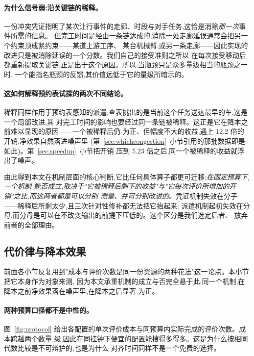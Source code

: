 \documentclass[manuscript,screen,review]{acmart}
\newcommand{\CostMultBefore}{12.2}
\newcommand{\CostMultAfter}{5.23}
\begin{document}
\paragraph{为什么信号弱:沿关键链的稀释。}
一份冲突凭证指明了某次让行事件的走廊、时段与对手任务,这恰是消除\emph{那一次}事件所需的信息。
但完工时间是经由一条链达成的,消除一处走廊延误通常会把另一个约束顶成紧约束——某道上游工序、
某台机械臂,或另一条走廊——因此实现的改进只是被消除延误的一个分数。我们自己的接受准则之所以
在每次接受移动后都重新提取关键链,正是出于这个原因。所以,当瓶颈只是众多量级相当的瓶颈之一时,
一个能指名瓶颈的反馈,其价值远低于它的量级所暗示的。

\paragraph{这如何解释预约表试探的两次不同结论。}
稀释同样作用于预约表感知的派遣:查表挑出的是当前这个任务送达最早的车,这是一个局部改进,其
对完工时间的影响也要经过同一条链被稀释。这正是它在降本之前难以显现的原因——一个被稀释后仍
为正、但幅度不大的收益,遇上 \CostMultBefore{} 倍的开销,净效果自然落进噪声里
(第~\ref{sec:whichcongestion}~小节引用的那批数据即是如此)。第~\ref{sec:speedup}~小节把开销
压到 \CostMultAfter{} 倍之后,同一个被稀释的收益就浮出了噪声。

由此得到本文在机制层面的核心判断,它比任何具体算子都更可迁移:\emph{在固定预算下,一个机制
能否成立,取决于"它被稀释后剩下的收益"与"它每次评价所增加的开销"之比,而这两者都是可以分别
测量、并可分别改进的。}凭证机制失效在分子——稀释后所剩太少,且三次针对性修补都无法把它抬起来;
派遣机制起初失效在分母,而分母是可以在不改变输出的前提下压低的。这个区分是我们选定后者、
放弃前者的全部理由。

\subsection{代价律与降本效果}
\label{sec:costlaw}

前面各小节反复用到"成本与评价次数是同一份资源的两种花法"这一论点。本小节把它本身作为对象来测,
因为本文承重机制的成立与否完全悬于此:同一个机制,在降本之前净效果落在噪声里,在降本之后显著
为正。

\paragraph{两种预算口径都不是中性的。}
图~\ref{fig:protocol} 给出各配置的单次评价成本与同预算内实际完成的评价次数。成本跨越两个数量
级,因此在同挂钟下便宜的配置能搜得多得多。这是为什么按相同代数比较是不可辩护的,也是为什么
对齐时间同样不是一个免费的选择。
\end{document}
